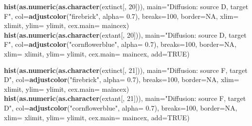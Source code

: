 \documentclass[]{book}
\newenvironment{Shaded}{\begin{snugshade}}{\end{snugshade}}
\newcommand{\KeywordTok}[1]{\textcolor[rgb]{0.13,0.29,0.53}{\textbf{{#1}}}}
\newcommand{\DataTypeTok}[1]{\textcolor[rgb]{0.13,0.29,0.53}{{#1}}}
\newcommand{\DecValTok}[1]{\textcolor[rgb]{0.00,0.00,0.81}{{#1}}}
\newcommand{\FloatTok}[1]{\textcolor[rgb]{0.00,0.00,0.81}{{#1}}}
\newcommand{\StringTok}[1]{\textcolor[rgb]{0.31,0.60,0.02}{{#1}}}
\newcommand{\OtherTok}[1]{\textcolor[rgb]{0.56,0.35,0.01}{{#1}}}
\newcommand{\NormalTok}[1]{{#1}}
\theoremstyle{definition}
\theoremstyle{definition}
\theoremstyle{remark}
\begin{document}
\begin{Shaded}
\begin{Highlighting}[]
\KeywordTok{hist}\NormalTok{(}\KeywordTok{as.numeric}\NormalTok{(}\KeywordTok{as.character}\NormalTok{(extinct[, }\DecValTok{20}\NormalTok{])), }\DataTypeTok{main=}\StringTok{"Diffusion: source D, target F"}\NormalTok{, }\DataTypeTok{col=}\KeywordTok{adjustcolor}\NormalTok{(}\StringTok{"firebrick"}\NormalTok{, }\DataTypeTok{alpha=} \FloatTok{0.7}\NormalTok{), }\DataTypeTok{breaks=}\DecValTok{100}\NormalTok{, }\DataTypeTok{border=}\OtherTok{NA}\NormalTok{, }\DataTypeTok{xlim=}\NormalTok{ xlimit, }\DataTypeTok{ylim=}\NormalTok{ ylimit, }\DataTypeTok{cex.main=}\NormalTok{ maincex)}
\KeywordTok{hist}\NormalTok{(}\KeywordTok{as.numeric}\NormalTok{(}\KeywordTok{as.character}\NormalTok{(extant[, }\DecValTok{20}\NormalTok{])), }\DataTypeTok{main=}\StringTok{"Diffusion: source D, target F"}\NormalTok{, }\DataTypeTok{col=}\KeywordTok{adjustcolor}\NormalTok{(}\StringTok{"cornflowerblue"}\NormalTok{, }\DataTypeTok{alpha=} \FloatTok{0.7}\NormalTok{), }\DataTypeTok{breaks=}\DecValTok{100}\NormalTok{, }\DataTypeTok{border=}\OtherTok{NA}\NormalTok{, }\DataTypeTok{xlim=}\NormalTok{ xlimit, }\DataTypeTok{ylim=}\NormalTok{ ylimit, }\DataTypeTok{cex.main=}\NormalTok{ maincex, }\DataTypeTok{add=}\OtherTok{TRUE}\NormalTok{)}

\KeywordTok{hist}\NormalTok{(}\KeywordTok{as.numeric}\NormalTok{(}\KeywordTok{as.character}\NormalTok{(extinct[, }\DecValTok{21}\NormalTok{])), }\DataTypeTok{main=}\StringTok{"Diffusion: source F, target D"}\NormalTok{, }\DataTypeTok{col=}\KeywordTok{adjustcolor}\NormalTok{(}\StringTok{"firebrick"}\NormalTok{, }\DataTypeTok{alpha=} \FloatTok{0.7}\NormalTok{), }\DataTypeTok{breaks=}\DecValTok{100}\NormalTok{, }\DataTypeTok{border=}\OtherTok{NA}\NormalTok{, }\DataTypeTok{xlim=}\NormalTok{ xlimit, }\DataTypeTok{ylim=}\NormalTok{ ylimit, }\DataTypeTok{cex.main=}\NormalTok{ maincex)}
\KeywordTok{hist}\NormalTok{(}\KeywordTok{as.numeric}\NormalTok{(}\KeywordTok{as.character}\NormalTok{(extant[, }\DecValTok{21}\NormalTok{])), }\DataTypeTok{main=}\StringTok{"Diffusion: source F, target D"}\NormalTok{, }\DataTypeTok{col=}\KeywordTok{adjustcolor}\NormalTok{(}\StringTok{"cornflowerblue"}\NormalTok{, }\DataTypeTok{alpha=} \FloatTok{0.7}\NormalTok{), }\DataTypeTok{breaks=}\DecValTok{100}\NormalTok{, }\DataTypeTok{border=}\OtherTok{NA}\NormalTok{, }\DataTypeTok{xlim=}\NormalTok{ xlimit, }\DataTypeTok{ylim=}\NormalTok{ ylimit, }\DataTypeTok{cex.main=}\NormalTok{ maincex, }\DataTypeTok{add=}\OtherTok{TRUE}\NormalTok{)}


\end{Highlighting}
\end{Shaded}
\end{document}
